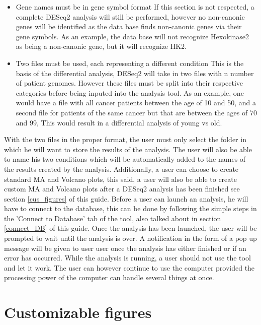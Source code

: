 \documentclass[11pt]{article}
\begin{document}
\begin{itemize}
\item Gene names must be in gene symbol format
If this section is not respected, a complete DESeq2 analysis will still be performed, however no non-canonic genes will be identified as the data base finds non-canonic genes via their gene symbols. As an example, the data base will not recognize Hexokinase2 as being a non-canonic gene, but it will recognize HK2.
\item Two files must be used, each representing a different condition
This is the basis of the differential analysis, DESeq2 will take in two files with n number of patient genomes. However these files must be split into their respective categories before being inputed into the analysis tool. As an example, one would have a file with all cancer patients between the age of 10 and 50, and a second file for patients of the same cancer but that are between the ages of 70 and 99, This would result in a differential analysis of young vs old.
\end{itemize}
With the two files in the proper format, the user must only select the folder in which he will want to store the results of the analysis. The user will also be able to name his two conditions which will be automatically added to the names of the results created by the analysis. Additionally, a user can choose to create standard MA and Volcano plots, this said, a user will also be able to create custom MA and Volcano plots after a DESeq2 analysis has been finished see section \ref{cus_figures} of this guide.
Before a user can launch an analysis, he will have to connect to the database, this can be done by following the simple steps in the 'Connect to Database' tab of the tool, also talked about in section \ref{connect_DB} of this guide.
Once the analysis has been launched, the user will be prompted to wait until the analysis is over. A notification in the form of a pop up message will be given to user user once the analysis has either finished or if an error has occurred. While the analysis is running, a user should not use the tool and let it work. The user can however continue to use the computer provided the processing power of the computer can handle several things at once.
                     
\section{Customizable figures \label{cus_figures}}





\end{document}
